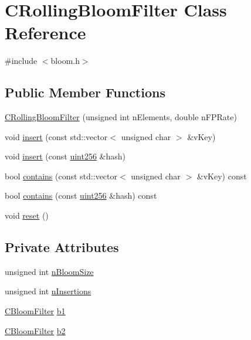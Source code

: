 \hypertarget{class_c_rolling_bloom_filter}{}\section{C\+Rolling\+Bloom\+Filter Class Reference}
\label{class_c_rolling_bloom_filter}


{\ttfamily \#include $<$bloom.\+h$>$}

\subsection*{Public Member Functions}
\begin{DoxyCompactItemize}
\item 
\mbox{\hyperlink{class_c_rolling_bloom_filter_a70f2c27fa28fc89676d3873159cfdecb}{C\+Rolling\+Bloom\+Filter}} (unsigned int n\+Elements, double n\+F\+P\+Rate)
\item 
void \mbox{\hyperlink{class_c_rolling_bloom_filter_a0fedbf0cf38c9070a30c7c5f8299f5d7}{insert}} (const std\+::vector$<$ unsigned char $>$ \&v\+Key)
\item 
void \mbox{\hyperlink{class_c_rolling_bloom_filter_aff399e835a59b4ced4d9af3ddce363a0}{insert}} (const \mbox{\hyperlink{classuint256}{uint256}} \&hash)
\item 
bool \mbox{\hyperlink{class_c_rolling_bloom_filter_a4f7d6161274b03c63be50aadb1fe46b7}{contains}} (const std\+::vector$<$ unsigned char $>$ \&v\+Key) const
\item 
bool \mbox{\hyperlink{class_c_rolling_bloom_filter_ae05528befdb97a19a1b31f30796ca7bd}{contains}} (const \mbox{\hyperlink{classuint256}{uint256}} \&hash) const
\item 
void \mbox{\hyperlink{class_c_rolling_bloom_filter_a7615966dc0beaa381892d8f43aeb53a3}{reset}} ()
\end{DoxyCompactItemize}
\subsection*{Private Attributes}
\begin{DoxyCompactItemize}
\item 
unsigned int \mbox{\hyperlink{class_c_rolling_bloom_filter_a5fa63c717bd8b41c149bb0462fae7898}{n\+Bloom\+Size}}
\item 
unsigned int \mbox{\hyperlink{class_c_rolling_bloom_filter_a393756a95c39b73f5f10d337ca12d5ac}{n\+Insertions}}
\item 
\mbox{\hyperlink{class_c_bloom_filter}{C\+Bloom\+Filter}} \mbox{\hyperlink{class_c_rolling_bloom_filter_ab15dfa505bcc7181e42588ead3bdd10b}{b1}}
\item 
\mbox{\hyperlink{class_c_bloom_filter}{C\+Bloom\+Filter}} \mbox{\hyperlink{class_c_rolling_bloom_filter_af9b4c16a31dd4aa5c6a16d7092c5c860}{b2}}
\end{DoxyCompactItemize}


